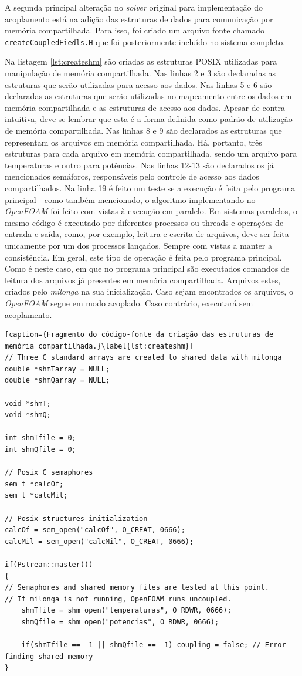 A segunda principal alteração no \textit{solver} original para implementação do acoplamento
está na adição das estruturas de dados para comunicação por memória compartilhada. Para isso,
foi criado um arquivo fonte chamado \texttt{createCoupledFiedls.H} que foi posteriormente
incluído no sistema completo.

Na listagem \ref{lst:createshm} são criadas as estruturas POSIX utilizadas para manipulação
de memória compartilhada. Nas linhas 2 e 3 são declaradas as estruturas que serão utilizadas para
acesso aos dados. Nas linhas 5 e 6 são declaradas as estruturas que serão utilizadas no mapeamento
entre os dados em memória compartilhada e as estruturas de acesso aos dados. Apesar de contra intuitiva,
deve-se lembrar que esta é a forma definida como padrão de utilização de memória compartilhada. Nas linhas
8 e 9 são declarados as estruturas que representam os arquivos em memória compartilhada. Há, portanto, três
estruturas para cada arquivo em memória compartilhada, sendo um arquivo para temperaturas e outro para potências.
Nas linhas 12-13 são declarados os já mencionados semáforos, responsáveis pelo controle de acesso aos
dados compartilhados. Na linha 19 é feito um teste se a execução é feita pelo programa principal - como também
mencionado, o algoritmo implementando no \textit{OpenFOAM} foi feito com vistas à execução em paralelo.
Em sistemas paralelos, o mesmo código é executado por diferentes processos ou threads e operações
de entrada e saída, como, por exemplo, leitura e escrita de arquivos, deve ser feita unicamente por um
dos processos lançados. Sempre com vistas a manter a consistência. Em geral, este tipo de operação
é feita pelo programa principal. Como é neste caso, em que no programa principal são executados
comandos de leitura dos arquivos já presentes em memória
compartilhada. Arquivos estes, criados pelo \textit{milonga} na sua inicialização. Caso sejam encontrados
os arquivos, o \textit{OpenFOAM} segue em modo acoplado. Caso contrário, executará sem acoplamento.


\begin{lstlisting}[caption={Fragmento do código-fonte da criação das estruturas de memória compartilhada.}\label{lst:createshm}]
// Three C standard arrays are created to shared data with milonga
double *shmTarray = NULL;
double *shmQarray = NULL;

void *shmT;
void *shmQ;

int shmTfile = 0;
int shmQfile = 0;

// Posix C semaphores
sem_t *calcOf;
sem_t *calcMil;

// Posix structures initialization
calcOf = sem_open("calcOf", O_CREAT, 0666);
calcMil = sem_open("calcMil", O_CREAT, 0666);

if(Pstream::master())
{
// Semaphores and shared memory files are tested at this point.
// If milonga is not running, OpenFOAM runs uncoupled.
    shmTfile = shm_open("temperaturas", O_RDWR, 0666);
    shmQfile = shm_open("potencias", O_RDWR, 0666);
    
    if(shmTfile == -1 || shmQfile == -1) coupling = false; // Error finding shared memory
}
\end{lstlisting}

